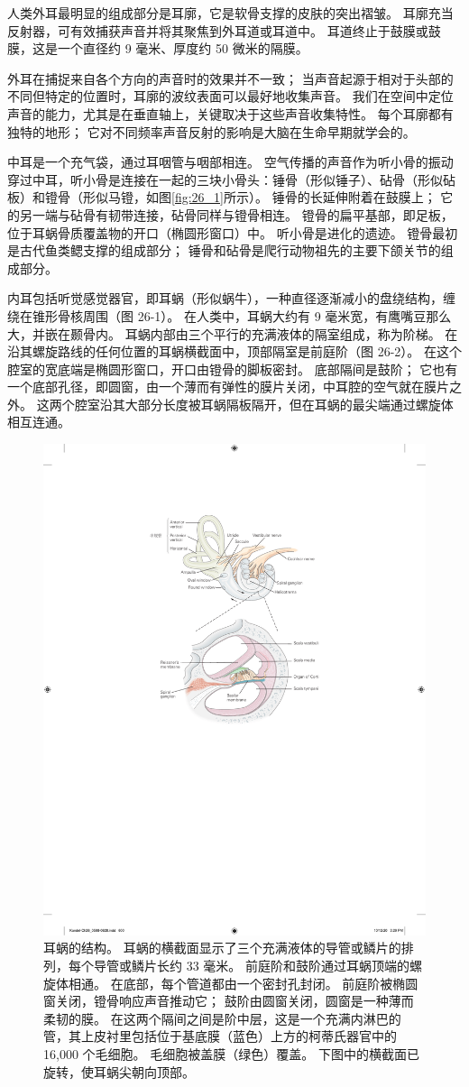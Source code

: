 人类外耳最明显的组成部分是耳廓，它是软骨支撑的皮肤的突出褶皱。 
耳廓充当反射器，可有效捕获声音并将其聚焦到外耳道或耳道中。 
耳道终止于鼓膜或鼓膜，这是一个直径约 9 毫米、厚度约 50 微米的隔膜。

外耳在捕捉来自各个方向的声音时的效果并不一致； 当声音起源于相对于头部的不同但特定的位置时，耳廓的波纹表面可以最好地收集声音。 
我们在空间中定位声音的能力，尤其是在垂直轴上，关键取决于这些声音收集特性。 
每个耳廓都有独特的地形； 它对不同频率声音反射的影响是大脑在生命早期就学会的。

中耳是一个充气袋，通过耳咽管与咽部相连。 
空气传播的声音作为听小骨的振动穿过中耳，听小骨是连接在一起的三块小骨头：锤骨（形似锤子）、砧骨（形似砧板）和镫骨（形似马镫，如图\ref{fig:26_1}所示）。 
锤骨的长延伸附着在鼓膜上； 它的另一端与砧骨有韧带连接，砧骨同样与镫骨相连。 
镫骨的扁平基部，即足板，位于耳蜗骨质覆盖物的开口（椭圆形窗口）中。 
听小骨是进化的遗迹。 
镫骨最初是古代鱼类鳃支撑的组成部分； 
锤骨和砧骨是爬行动物祖先的主要下颌关节的组成部分。


内耳包括听觉感觉器官，即耳蜗（形似蜗牛），一种直径逐渐减小的盘绕结构，缠绕在锥形骨核周围（图 26-1）。 
在人类中，耳蜗大约有 9 毫米宽，有鹰嘴豆那么大，并嵌在颞骨内。 
耳蜗内部由三个平行的充满液体的隔室组成，称为阶梯。
在沿其螺旋路线的任何位置的耳蜗横截面中，顶部隔室是前庭阶（图 26-2）。 
在这个腔室的宽底端是椭圆形窗口，开口由镫骨的脚板密封。 底部隔间是鼓阶； 它也有一个底部孔径，即圆窗，由一个薄而有弹性的膜片关闭，中耳腔的空气就在膜片之外。 这两个腔室沿其大部分长度被耳蜗隔板隔开，但在耳蜗的最尖端通过螺旋体相互连通。

\begin{figure}[htbp]
	\centering
	\includegraphics[width=0.5\linewidth]{chap26/fig_26_2}
	\caption{耳蜗的结构。 
		耳蜗的横截面显示了三个充满液体的导管或鳞片的排列，每个导管或鳞片长约 33 毫米。 
		前庭阶和鼓阶通过耳蜗顶端的螺旋体相通。 
		在底部，每个管道都由一个密封孔封闭。 
		前庭阶被椭圆窗关闭，镫骨响应声音推动它； 鼓阶由圆窗关闭，圆窗是一种薄而柔韧的膜。 
		在这两个隔间之间是阶中层，这是一个充满内淋巴的管，其上皮衬里包括位于基底膜（蓝色）上方的柯蒂氏器官中的 16,000 个毛细胞。 
		毛细胞被盖膜（绿色）覆盖。 
		下图中的横截面已旋转，使耳蜗尖朝向顶部。}
	\label{fig:26_2}
\end{figure}


